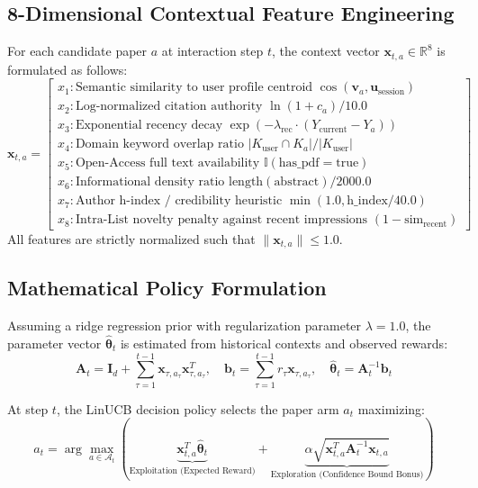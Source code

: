 \documentclass[11pt,a4paper]{article}
\begin{document}
\subsection{8-Dimensional Contextual Feature Engineering}
For each candidate paper $a$ at interaction step $t$, the context vector $\mathbf{x}_{t, a} \in \mathbb{R}^8$ is formulated as follows:
\begin{equation}
\mathbf{x}_{t, a} = \begin{bmatrix}
x_1: \text{Semantic similarity to user profile centroid } \cos(\mathbf{v}_a, \mathbf{u}_{\text{session}}) \\
x_2: \text{Log-normalized citation authority } \ln(1 + c_a) / 10.0 \\
x_3: \text{Exponential recency decay } \exp(-\lambda_{\text{rec}} \cdot (Y_{\text{current}} - Y_a)) \\
x_4: \text{Domain keyword overlap ratio } |K_{\text{user}} \cap K_a| / |K_{\text{user}}| \\
x_5: \text{Open-Access full text availability } \mathbb{I}(\text{has\_pdf} = \text{true}) \\
x_6: \text{Informational density ratio } \text{length}(\text{abstract}) / 2000.0 \\
x_7: \text{Author h-index / credibility heuristic } \min(1.0, \text{h\_index} / 40.0) \\
x_8: \text{Intra-List novelty penalty against recent impressions } (1 - \text{sim}_{\text{recent}})
\end{bmatrix}
\end{equation}
All features are strictly normalized such that $\|\mathbf{x}_{t, a}\| \le 1.0$.

\subsection{Mathematical Policy Formulation}
Assuming a ridge regression prior with regularization parameter $\lambda = 1.0$, the parameter vector $\hat{\boldsymbol{\theta}}_t$ is estimated from historical contexts and observed rewards:
\begin{equation}
\mathbf{A}_t = \mathbf{I}_d + \sum_{\tau=1}^{t-1} \mathbf{x}_{\tau, a_\tau} \mathbf{x}_{\tau, a_\tau}^T, \quad \mathbf{b}_t = \sum_{\tau=1}^{t-1} r_\tau \mathbf{x}_{\tau, a_\tau}, \quad \hat{\boldsymbol{\theta}}_t = \mathbf{A}_t^{-1} \mathbf{b}_t
\end{equation}

At step $t$, the LinUCB decision policy selects the paper arm $a_t$ maximizing:
\begin{equation}
a_t = \arg\max_{a \in \mathcal{A}_t} \left( \underbrace{\mathbf{x}_{t, a}^T \hat{\boldsymbol{\theta}}_t}_{\text{Exploitation (Expected Reward)}} + \underbrace{\alpha \sqrt{\mathbf{x}_{t, a}^T \mathbf{A}_t^{-1} \mathbf{x}_{t, a}}}_{\text{Exploration (Confidence Bound Bonus)}} \right)
\end{equation}
\end{document}
